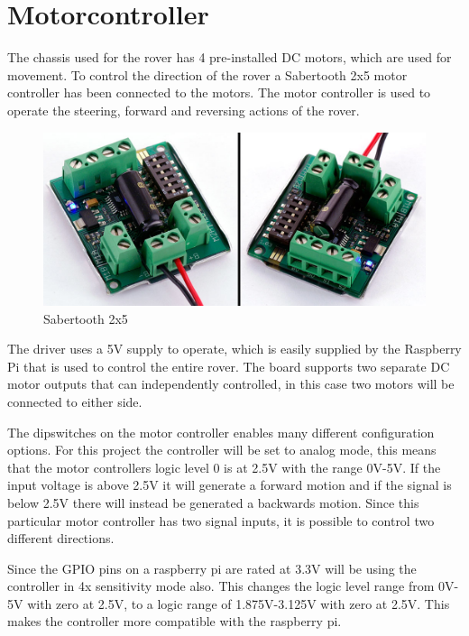\clearpage
\section{Motorcontroller}

The chassis used for the rover has 4 pre-installed DC motors, which are used for movement. To control the direction of the rover a Sabertooth 2x5 motor controller has been connected to the motors. The motor controller is used to operate the steering, forward and reversing actions of the rover.

\begin{figure}[H]
	\centering
	\includegraphics[width=.8\linewidth]{images/Sabertooth2X5big.jpg}
	\caption{Sabertooth 2x5\cite{sabertoothpic}}
\end{figure}

The driver uses a 5V supply to operate, which is easily supplied by the Raspberry Pi that is used to control the entire rover. The board supports two separate DC motor outputs that can independently controlled, in this case two motors will be connected to either side.

The dipswitches on the motor controller enables many different configuration options. For this project the controller will be set to analog mode, this means that the motor controllers logic level 0 is at 2.5V with the range 0V-5V. If the input voltage is above 2.5V it will generate a forward motion and if the signal is below 2.5V there will instead be generated a backwards motion. Since this particular motor controller has two signal inputs, it is possible to control two different directions\cite{sabertoothdata}.

Since the GPIO pins on a raspberry pi are rated at 3.3V will be using the controller in 4x sensitivity mode also. This changes the logic level range from 0V-5V with zero at 2.5V, to a logic range of 1.875V-3.125V with zero at 2.5V.  
This makes the controller more compatible with the raspberry pi.

